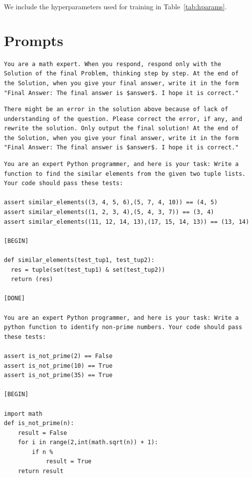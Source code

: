 \begin{appendix}
We include the hyperparameters used for training \methodname{} in Table~\ref{tab:hparams}.

\section{Prompts}
\label{app:prompts}

\begin{lstlisting}[title={MATH Zero-shot Prompt}]
You are a math expert. When you respond, respond only with the Solution of the final Problem, thinking step by step. At the end of the Solution, when you give your final answer, write it in the form "Final Answer: The final answer is $answer$. I hope it is correct."
\end{lstlisting}

\begin{lstlisting}[title=MATH Self-Correction Instruction]
There might be an error in the solution above because of lack of understanding of the question. Please correct the error, if any, and rewrite the solution. Only output the final solution! At the end of the Solution, when you give your final answer, write it in the form "Final Answer: The final answer is $answer$. I hope it is correct."
\end{lstlisting}

\begin{lstlisting}[title=MBPP 3-shot Prompt]
You are an expert Python programmer, and here is your task: Write a function to find the similar elements from the given two tuple lists. Your code should pass these tests:

assert similar_elements((3, 4, 5, 6),(5, 7, 4, 10)) == (4, 5)
assert similar_elements((1, 2, 3, 4),(5, 4, 3, 7)) == (3, 4)
assert similar_elements((11, 12, 14, 13),(17, 15, 14, 13)) == (13, 14)

[BEGIN]

def similar_elements(test_tup1, test_tup2):
  res = tuple(set(test_tup1) & set(test_tup2))
  return (res)

[DONE]

You are an expert Python programmer, and here is your task: Write a python function to identify non-prime numbers. Your code should pass these tests:

assert is_not_prime(2) == False
assert is_not_prime(10) == True
assert is_not_prime(35) == True

[BEGIN]

import math
def is_not_prime(n):
    result = False
    for i in range(2,int(math.sqrt(n)) + 1):
        if n %
            result = True
    return result


\end{lstlisting}
\end{appendix}
